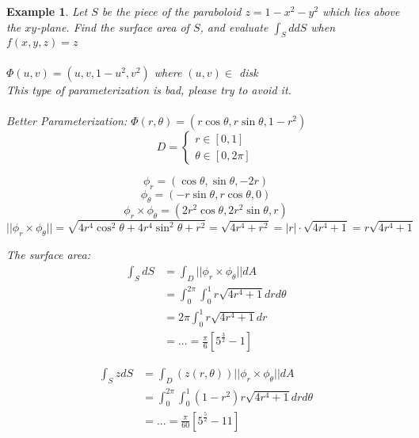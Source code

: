 \documentclass[12pt]{article}
\theoremstyle{plain}
\newtheorem{example}[theorem]{Example}
\theoremstyle{definition}
\begin{document}
\begin{example}
	Let $S$ be the piece of the paraboloid $z=1-x^2 -y^2$ which lies above the $xy$-plane. Find the surface area of $S$, and evaluate $\int_S d dS$ when $f(x,y,z)=z$\\
	\\
	$\Phi (u,v) = (u,v,1-u^2,v^2)$ where $(u,v) \in$ disk\\
	This type of parameterization is bad, please try to avoid it.\\
	\\
	Better Parameterization: $\Phi (r, \theta) = (r\cos\theta, r\sin\theta, 1-r^2)$
	$$D = \begin{cases}
		r \in [0,1]\\
		\theta \in [0,2\pi]
	\end{cases}$$

	$$\phi_r = (\cos\theta, \sin\theta, -2r)$$
	$$\phi_\theta = (-r\sin\theta, r\cos\theta, 0)$$
	$$\phi_r \times \phi_\theta = (2r^2 \cos\theta, 2r^2 \sin\theta, r)$$
	$$||\phi_r \times \phi_\theta|| = \sqrt{4r^4 \cos^2 \theta + 4r^4 \sin^2 \theta + r^2} = \sqrt{4r^4 + r^2} = |r| \cdot \sqrt{4r^4 + 1} = r\sqrt{4r^4 + 1}$$

	The surface area:
	\begin{align*}
		\int_S dS &= \int_D ||\phi_r \times \phi_\theta|| dA\\
		&= \int^{2\pi}_0 \int^1_0 r\sqrt{4r^4 + 1} dr d\theta\\
		&= 2\pi \int^1_0 r\sqrt{4r^4 + 1} dr\\
		&= ... = \frac{\pi}{6} [5^{\frac{3}{2}} - 1]
	\end{align*}

	\begin{align*}
		\int_S z dS &= \int_D (z(r,\theta)) ||\phi_r \times \phi_\theta|| dA\\
		&= \int^{2\pi}_0 \int^1_0 (1-r^2) r\sqrt{4r^4 + 1} dr d\theta\\
		&= ... = \frac{\pi}{60} [5^{\frac{5}{2}} - 11]
	\end{align*}
\end{example}
\end{document}
